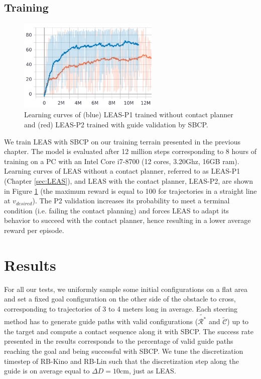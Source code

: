 \subsection{Training}
\begin{figure}[t]
    \centering
    \includegraphics[width=0.6\textwidth]{Figures/Chapter_CPSB/learning_curve_p1_p2.png}
    \caption{Learning curves of (blue) LEAS-P1 trained without contact planner and (red) LEAS-P2 trained with guide validation by SBCP.}
    \label{fig:cp-sb:learning_curves_p1_p2}
\end{figure}
We train LEAS with SBCP on our training terrain presented in the previous chapter.
The model is evaluated after 12 million steps corresponding to 8 hours of training on a PC with an Intel Core i7-8700 (12 cores, 3.20Ghz, 16GB ram). 
Learning curves of LEAS without a contact planner, referred to as LEAS-P1 (Chapter \ref{sec:LEAS}), and LEAS with the contact planner, LEAS-P2, are shown in Figure \ref{fig:cp-sb:learning_curves_p1_p2} (the maximum reward is equal to 100 for trajectories in a straight line at $v_{desired}$). 
The P2 validation increases its probability to meet a terminal condition (i.e. failing the contact planning) and forces LEAS to adapt its behavior to succeed with the contact planner, hence resulting in a lower average reward per episode.

\section{Results\label{sub:cp-sb:results}}

For all our tests, we uniformly sample some initial configurations on a flat area and set a fixed goal configuration on the other side of the obstacle to cross, corresponding to trajectories of 3 to 4 meters long in average.
Each steering method has to generate guide paths with valid configurations ($\tilde{\mathcal{R}^*}$ and $\tilde{\mathcal{C}}$) up to the target and compute a contact sequence along it with SBCP.
The success rate presented in the results corresponds to the percentage of valid guide paths reaching the goal and being successful with SBCP.
We tune the discretization timestep of RB-Kino and RB-Lin such that the discretization step along the guide is on average equal to $\Delta D=10$cm, just as LEAS.

